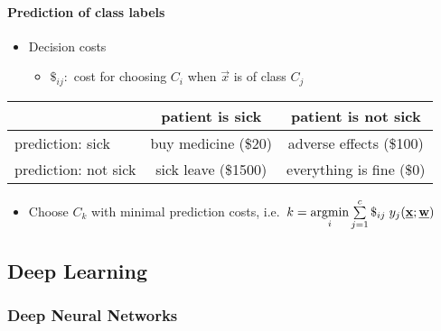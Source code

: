 \paragraph{Prediction of class labels}
	\begin{itemize}
		\item Decision costs 
			\begin{itemize}
				\item $\$_{ij}:$ cost for choosing $C_i$ 
					when $\vec x$ is of class $C_j$ \\[4mm]
			\end{itemize}
	\end{itemize}
	\begin{center}
		\footnotesize
		\begin{tabular}{|l|cc|}
			\hline
									& patient is sick & patient is not sick \\
			\hline
			prediction: sick 		& buy medicine (\$20)	
				& adverse effects (\$100)\\
			prediction: not sick	& sick leave (\$1500) 
				& everything is fine (\$0) \\
			\hline
		\end{tabular}
	\end{center}
	\vspace{8mm}
	\begin{itemize}
		\item Choose $C_k$ with minimal prediction costs,
			i.e.~$k = \argmin\limits_{i} 
			\sum\limits_{j=1}^c \$_{ij} \; y_j(\vec x; \vec w)$
	\end{itemize}




\newpage					%

\subsection{Deep Learning}
\subsubsection{Deep Neural Networks}
